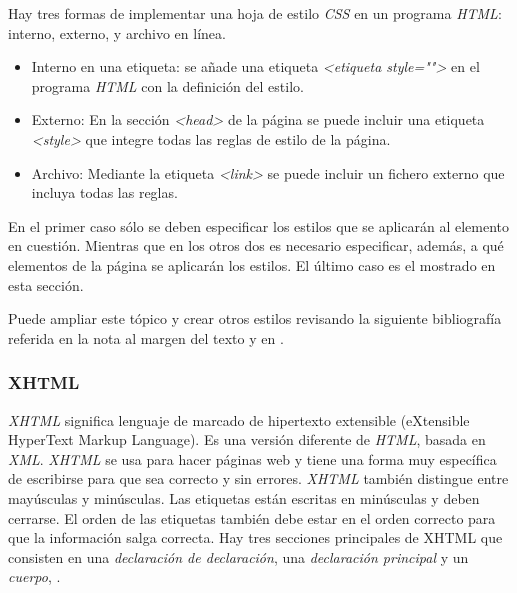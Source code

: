  Hay tres formas de implementar una hoja de estilo \textit{CSS} en un programa \textit{HTML}: interno, externo, y archivo en línea. 
\begin{itemize}
	\item Interno en una etiqueta: se añade una etiqueta \textit{<etiqueta style="">} en el programa \textit{HTML} con la definición del estilo. 
	\item Externo: En la sección \textit{<head>} de la página se puede incluir una etiqueta \textit{<style>} que integre todas las reglas de estilo de la página.
	\item Archivo: Mediante la etiqueta \textit{<link>} se puede incluir un fichero externo que incluya todas las reglas.
\end{itemize}
 
 
 En el primer caso sólo se deben especificar los estilos que se aplicarán al elemento en cuestión. Mientras que en los otros dos es necesario especificar, además, a qué elementos de la página se aplicarán los estilos. El último caso es el  mostrado en esta sección. 
 
 
 Puede ampliar  este tópico y crear otros estilos revisando la siguiente bibliografía referida en la nota al margen del texto y en .
 

 
\subsubsection{XHTML} 

\textit{XHTML} significa lenguaje de marcado de hipertexto extensible (eXtensible HyperText Markup Language). Es una versión diferente de \textit{HTML}, basada en \textit{XML}. \textit{XHTML} se usa para hacer páginas web y tiene una forma muy específica de escribirse para que sea correcto y sin errores. \textit{XHTML} también distingue entre mayúsculas y minúsculas. Las etiquetas están escritas en minúsculas y deben cerrarse. El orden de las etiquetas también debe estar en el orden correcto para que la información salga correcta. Hay tres secciones principales de XHTML que consisten en una \textit{declaración de declaración}, una \textit{declaración principal} y un \textit{cuerpo}, .

